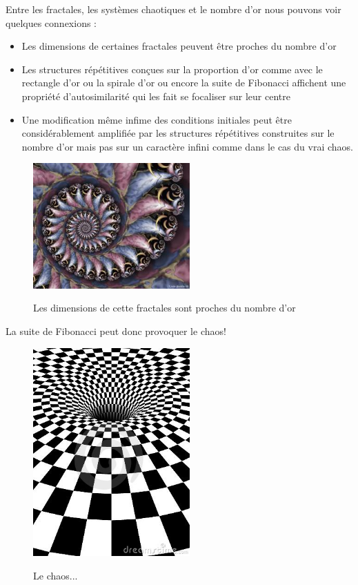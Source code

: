 \documentclass[french,11pt]{report}
\begin{document}
Entre les fractales, les systèmes chaotiques et le nombre d’or nous pouvons voir quelques connexions :
\begin{itemize}
    \item Les dimensions de certaines fractales peuvent être proches du nombre d’or 
    \item Les structures répétitives conçues sur la proportion d’or comme avec le rectangle d’or ou la spirale d’or ou encore la suite de Fibonacci affichent une propriété d’autosimilarité qui les fait se focaliser sur leur centre
    \item Une modification même infime des conditions initiales peut être considérablement amplifiée par les structures répétitives construites sur le nombre d’or mais pas sur un caractère infini comme dans le cas du vrai chaos.
\end{itemize}

\begin{figure} [!h]
    \centering
    \includegraphics[width=6cm]{structure_or}
    \label{fig:structure_or}
    \caption{Les dimensions de cette fractales sont proches du nombre d'or}
\end{figure}

La suite de Fibonacci peut donc provoquer le chaos!

\begin{figure} [!h]
    \centering
    \includegraphics[width=6cm]{chaos2}
    \label{fig:chaos2}
    \caption{Le chaos...}
\end{figure}
\end{document}

